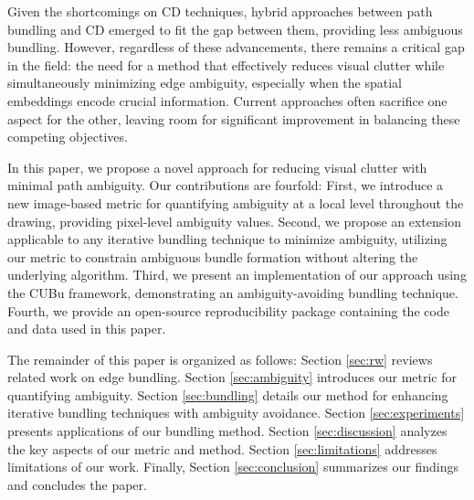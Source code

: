 
Given the shortcomings on CD techniques, hybrid approaches between path bundling and CD emerged to fit the gap between them, providing less ambiguous bundling\cite{bach:2016,zheng:2021,wallinger:2022}. However, regardless of these advancements, there remains a critical gap in the field: the need for a method that effectively reduces visual clutter while simultaneously minimizing edge ambiguity, especially when the spatial embeddings encode crucial information. Current approaches often sacrifice one aspect for the other, leaving room for significant improvement in balancing these competing objectives.


In this paper, we propose a novel approach for reducing visual clutter with minimal path ambiguity. Our contributions are fourfold: First, we introduce a new image-based metric for quantifying ambiguity at a local level throughout the drawing, providing pixel-level ambiguity values. Second, we propose an extension applicable to any iterative bundling technique to minimize ambiguity, utilizing our metric to constrain ambiguous bundle formation without altering the underlying algorithm. Third, we present an implementation of our approach using the CUBu framework, demonstrating an ambiguity-avoiding bundling technique. Fourth, we provide an open-source reproducibility package containing the code and data used in this paper.

The remainder of this paper is organized as follows: Section \ref{sec:rw} reviews related work on edge bundling. Section \ref{sec:ambiguity} introduces our metric for quantifying ambiguity. Section \ref{sec:bundling} details our method for enhancing iterative bundling techniques with ambiguity avoidance. Section \ref{sec:experiments} presents applications of our bundling method. Section \ref{sec:discussion} analyzes the key aspects of our metric and method. Section \ref{sec:limitations} addresses limitations of our work. Finally, Section \ref{sec:conclusion} summarizes our findings and concludes the paper.
